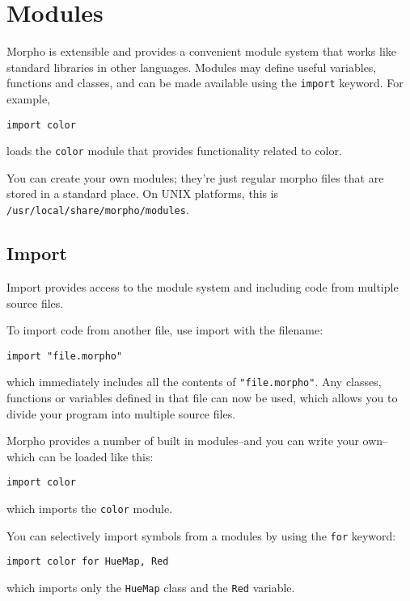 \hypertarget{modules}{%
\section{Modules}\label{modules}}

Morpho is extensible and provides a convenient module system that works
like standard libraries in other languages. Modules may define useful
variables, functions and classes, and can be made available using the
\texttt{import} keyword. For example,

\begin{lstlisting}
import color
\end{lstlisting}

loads the \texttt{color} module that provides functionality related to
color.

You can create your own modules; they're just regular morpho files that
are stored in a standard place. On UNIX platforms, this is
\texttt{/usr/local/share/morpho/modules}.

\hypertarget{import}{%
\subsection{Import}\label{import}}

Import provides access to the module system and including code from
multiple source files.

To import code from another file, use import with the filename:

\begin{lstlisting}
import "file.morpho"
\end{lstlisting}

which immediately includes all the contents of \texttt{"file.morpho"}.
Any classes, functions or variables defined in that file can now be
used, which allows you to divide your program into multiple source
files.

Morpho provides a number of built in modules--and you can write your
own--which can be loaded like this:

\begin{lstlisting}
import color
\end{lstlisting}

which imports the \texttt{color} module.

You can selectively import symbols from a modules by using the
\texttt{for} keyword:

\begin{lstlisting}
import color for HueMap, Red
\end{lstlisting}

which imports only the \texttt{HueMap} class and the \texttt{Red}
variable.
